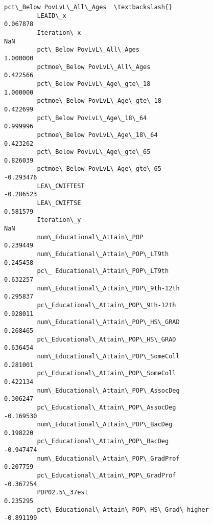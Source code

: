 \documentclass[11pt]{article}
\begin{document}
\begin{Verbatim}[commandchars=\\\{\}]
                                                    pct\_Below PovLvL\_All\_Ages  \textbackslash{}
         LEAID\_x                                                     0.067878   
         Iteration\_x                                                      NaN   
         pct\_Below PovLvL\_All\_Ages                                   1.000000   
         pctmoe\_Below PovLvL\_All\_Ages                                0.422566   
         pct\_Below PovLvL\_Age\_gte\_18                                 1.000000   
         pctmoe\_Below PovLvL\_Age\_gte\_18                              0.422699   
         pct\_Below PovLvL\_Age\_18\_64                                  0.999996   
         pctmoe\_Below PovLvL\_Age\_18\_64                               0.423262   
         pct\_Below PovLvL\_Age\_gte\_65                                 0.826039   
         pctmoe\_Below PovLvL\_Age\_gte\_65                             -0.293476   
         LEA\_CWIFTEST                                               -0.286523   
         LEA\_CWIFTSE                                                 0.581579   
         Iteration\_y                                                      NaN   
         num\_Educational\_Attain\_POP                                  0.239449   
         num\_Educational\_Attain\_POP\_LT9th                            0.245458   
         pc\_ Educational\_Attain\_POP\_LT9th                            0.632257   
         num\_Educational\_Attain\_POP\_9th-12th                         0.295837   
         pc\_Educational\_Attain\_POP\_9th-12th                          0.928011   
         num\_Educational\_Attain\_POP\_HS\_GRAD                          0.268465   
         pc\_Educational\_Attain\_POP\_HS\_GRAD                           0.636454   
         num\_Educational\_Attain\_POP\_SomeColl                         0.281001   
         pc\_Educational\_Attain\_POP\_SomeColl                          0.422134   
         num\_Educational\_Attain\_POP\_AssocDeg                         0.306247   
         pc\_Educational\_Attain\_POP\_AssocDeg                         -0.169530   
         num\_Educational\_Attain\_POP\_BacDeg                           0.198220   
         pc\_Educational\_Attain\_POP\_BacDeg                           -0.947474   
         num\_Educational\_Attain\_POP\_GradProf                         0.207759   
         pc\_Educational\_Attain\_POP\_GradProf                         -0.367254   
         PDP02.5\_37est                                               0.235295   
         pct\_Educational\_Attain\_POP\_HS\_Grad\_higher                  -0.891199   

\end{Verbatim}
\end{document}
